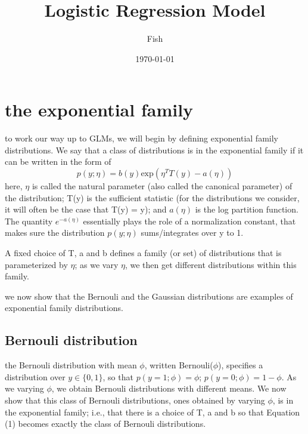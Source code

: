 \documentclass[12pt]{ctexart}%
\title{\kaishu Logistic Regression Model}
\author{Fish}
\date{\today}
\begin{document}
	\maketitle
	\renewcommand{\contentsname}{Content} %
	\tableofcontents
	\clearpage
	\pagestyle{fancy}
	\setcounter{page}{1}
	
	\section{\quad the exponential family}
	to work our way up to GLMs, we will begin by defining exponential family distributions. We say that a class of distributions is in the exponential family if it can be written in the form of 
	\begin{equation}
	p(y;\eta) = b(y)\text{exp}(\eta^T T(y) - a(\eta) )
	\end{equation}
	\qquad here, $\eta$ is called the natural parameter (also called the canonical parameter) of the distribution; T(y) is the sufficient statistic (for the distributions we consider, it will often be the case that T(y) = y); and $a(\eta)$ is the log partition function. The quantity $e^{-a(\eta)}$ essentially plays the role of a normalization constant, that makes sure the distribution $p(y;\eta)$ sums/integrates over y to 1.
	
	A fixed choice of T, a and b defines a family (or set) of distributions that is parameterized by $\eta$; as we vary $\eta$, we then get different distributions within this family. 
	
	we now show that the Bernouli and the Gaussian distributions are examples of exponential family distributions.
	
	\subsection{\quad Bernouli distribution}
		the Bernouli distribution with mean $\phi$, written Bernouli($\phi$), specifies a distribution over $y\in{\{0,1\}}$, so that $p(y=1;\phi) = \phi$; $p(y=0;\phi) = 1-\phi$. As we varying $\phi$, we obtain Bernouli distributions with different means. We now show that this class of Bernouli distributions, ones obtained by varying $\phi$, is in the exponential family; i.e., that there is a choice of T, a and b so that Equation (1) becomes exactly the class of Bernouli distributions.
		
\end{document}
